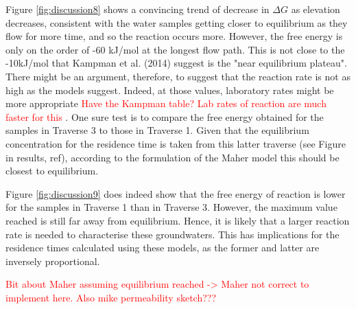 Figure \ref{fig:discussion8} shows a convincing trend of decrease in $\Delta G$ as elevation decreases, consistent with the water samples getting closer to equilibrium as they flow for more time, and so the reaction occurs more. However, the free energy is only on the order of -60 kJ/mol at the longest flow path. This is not close to the -10kJ/mol that Kampman et al. (2014) suggest is the "near equilibrium plateau". There might be an argument, therefore, to suggest that the reaction rate is not as high as the models suggest. Indeed, at those values, laboratory rates might be more appropriate \textcolor{red}{Have the Kampman table? Lab rates of reaction are much faster for this }. One sure test is to compare the free energy obtained for the samples in Traverse 3 to those in Traverse 1. Given that the equilibrium concentration for the residence time is taken from this latter traverse (see Figure in results, ref), according to the formulation of the Maher model this should be closest to equilibrium.

\bsk

Figure \ref{fig:discussion9} does indeed show that the free energy of reaction is lower for the samples in Traverse 1 than in Traverse 3. However, the maximum value reached is still far away from equilibrium. Hence, it is likely that a larger reaction rate is needed to characterise these groundwaters. This has implications for the residence times calculated using these models, as the former and latter are inversely proportional.


\textcolor{red}{Bit about Maher assuming equilibrium reached -> Maher not correct to implement here. Also mike permeability sketch???}


